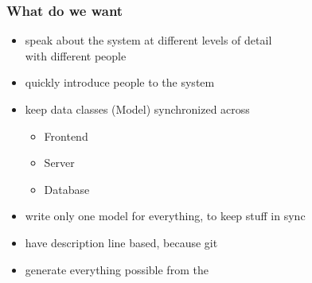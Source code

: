 \documentclass[xelatex,13pt]{beamer}
\begin{document}
\begin{frame}
	\frametitle{What do we want}
	\begin{itemize}
		\item speak about the system at different levels of detail\\
		with different people
		\item quickly introduce people to the system
		\item keep data classes (Model) synchronized across
		\begin{itemize}
			\item Frontend
			\item Server
			\item Database
		\end{itemize}
		\item write only one model for everything, to keep stuff in sync
		\item have description line based, because git
		\item generate everything possible from the
	\end{itemize}
\end{frame}
\end{document}
